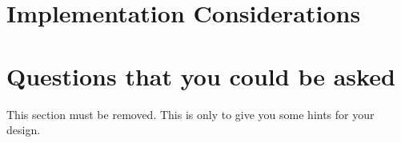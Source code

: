 \section{Implementation Considerations}

\subsubsection{\taskA}


\subsubsection{\taskB}


\subsubsection{\taskC}


\section{Questions that you could be asked}

This section must be removed. This is only to give you some hints for your design. 

